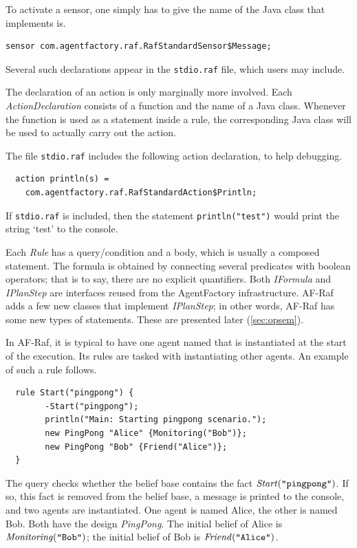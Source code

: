 \documentclass[a4paper,12pt,oneside,fleqn]{book} %
\begin{document}
{\begin{example}
To activate a sensor, one simply has to give the name of the Java class
that implements is.
\begin{verbatim}
sensor com.agentfactory.raf.RafStandardSensor$Message;
\end{verbatim}
Several such declarations appear in the {\tt stdio.raf} file, which users
may include.
\end{example}

The declaration of an action is only marginally more involved.  Each
{\it ActionDeclaration\/} consists of a function and the name of a Java
class. Whenever the function is used as a statement inside a rule, the
corresponding Java class will be used to actually carry out the action.

\begin{example}
The file {\tt stdio.raf} includes the following action declaration, to help
debugging.
\begin{verbatim}
  action println(s) =
    com.agentfactory.raf.RafStandardAction$Println;
\end{verbatim}
If {\tt stdio.raf} is included, then the statement {\tt println("test")}
would print the string `test' to the console.
\end{example}

Each {\it Rule\/} has a query\slash condition and a body, which is usually
a composed statement. The formula is obtained by connecting several
predicates with boolean operators; that is to say, there are no explicit
quantifiers. Both {\it IFormula\/} and {\it IPlanStep\/} are interfaces
reused from the AgentFactory infrastructure. AF-Raf adds a few new classes
that implement {\it IPlanStep\/}; in other words, AF-Raf has some new
types of statements. These are presented later (\autoref{sec:opsem}).

\begin{example}
In AF-Raf, it is typical to have one agent named that is instantiated at
the start of the execution. Its rules are tasked with instantiating other
agents. An example of such a rule follows.
\begin{verbatim}
  rule Start("pingpong") {
        -Start("pingpong");
        println("Main: Starting pingpong scenario.");
        new PingPong "Alice" {Monitoring("Bob")};
        new PingPong "Bob" {Friend("Alice")};
  }
\end{verbatim}
The query checks whether the belief base contains the fact ${\it
Start}(\text{\tt``pingpong''})$. If so, this fact is removed from the
belief base, a message is printed to the console, and two agents are
instantiated. One agent is named Alice, the other is named Bob. Both have
the design {\it PingPong}. The initial belief of Alice is ${\it
Monitoring}(\text{\tt ``Bob''})$; the initial belief of Bob is ${\it
Friend}(\text{\tt``Alice''})$.
\end{example}

}
\end{document}
